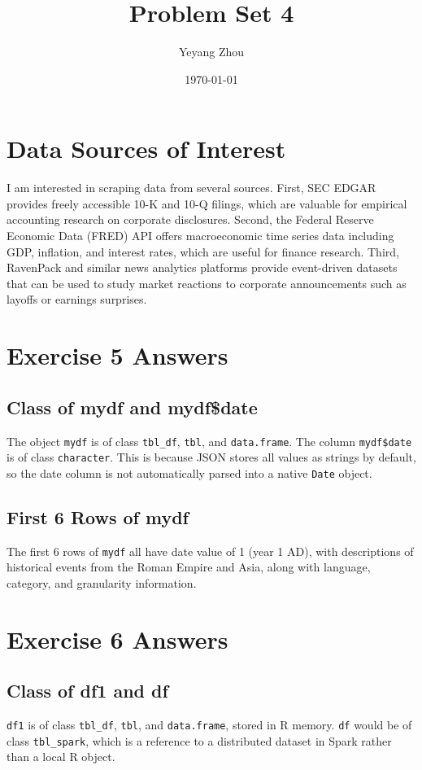 \documentclass{article}
\title{Problem Set 4}
\author{Yeyang Zhou}
\date{\today}
\begin{document}
\maketitle

\section{Data Sources of Interest}

I am interested in scraping data from several sources. First, SEC EDGAR provides 
freely accessible 10-K and 10-Q filings, which are valuable for empirical accounting 
research on corporate disclosures. Second, the Federal Reserve Economic Data (FRED) 
API offers macroeconomic time series data including GDP, inflation, and interest rates, 
which are useful for finance research. Third, RavenPack and similar news analytics 
platforms provide event-driven datasets that can be used to study market reactions 
to corporate announcements such as layoffs or earnings surprises.

\section{Exercise 5 Answers}

\subsection{Class of mydf and mydf\$date}
The object \texttt{mydf} is of class \texttt{tbl\_df}, \texttt{tbl}, and 
\texttt{data.frame}. The column \texttt{mydf\$date} is of class \texttt{character}. 
This is because JSON stores all values as strings by default, so the date column 
is not automatically parsed into a native \texttt{Date} object.

\subsection{First 6 Rows of mydf}
The first 6 rows of \texttt{mydf} all have date value of 1 (year 1 AD), with 
descriptions of historical events from the Roman Empire and Asia, along with 
language, category, and granularity information.

\section{Exercise 6 Answers}

\subsection{Class of df1 and df}
\texttt{df1} is of class \texttt{tbl\_df}, \texttt{tbl}, and \texttt{data.frame}, 
stored in R memory. \texttt{df} would be of class \texttt{tbl\_spark}, which is 
a reference to a distributed dataset in Spark rather than a local R object.
\end{document}
